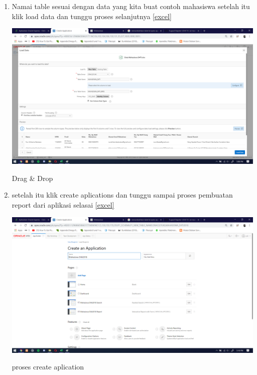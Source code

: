 \documentclass{article}
\begin{document}
\begin{enumerate}
     \item Namai table sesuai dengan data yang kita buat contoh mahasiswa setelah itu klik load data dan tunggu proses selanjutnya
      \ref{excel}
    \begin{center}
         \centering
            \includegraphics[scale=0.27]{figures/DB4.png}
        \caption{Drag & Drop}
        \label{excel}
    \end{center}
    
     \item setelah itu klik create aplications dan tunggu sampai proses pembuatan report dari aplikasi selasai
      \ref{excel}
    \begin{center}
         \centering
            \includegraphics[scale=0.27]{figures/DB5.png}
        \caption{proses create aplication}
        \label{excel}
    \end{center}
    

\end{enumerate}
\end{document}
